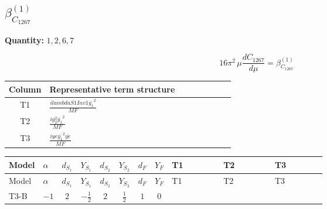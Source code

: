 \documentclass[8pt]{article}
\begin{document}
\begin{landscape}
\section*{$\beta_{C_{1267}}^{(1)}$}
\noindent\textbf{Quantity: }$\mathrm{1,2,6,7}$\par\smallskip
\[16\pi^2\,\mu\frac{d C_{1267}}{d\mu}=\beta_{C_{1267}}^{(1)}\]
\begin{center}
\begin{tabular}{@{}c >{\raggedright\arraybackslash}p{0.82\linewidth}@{}}
\toprule
Column & Representative term structure \\
\midrule
T1 & \(\displaystyle \frac{i lambdaS1Inv1 \overline{y_{1}}^{2}}{MF}\) \\
\midrule
T2 & \(\displaystyle \frac{i g_{2}^{2} \overline{y_{1}}^{2}}{MF}\) \\
\midrule
T3 & \(\displaystyle \frac{i ye \overline{y_{1}}^{2} \overline{ye}}{MF}\) \\
\midrule
\bottomrule
\end{tabular}
\end{center}
\smallskip
\tiny
\begin{longtable}{@{}llcccccc >{\raggedright\arraybackslash}p{0.21\linewidth} >{\raggedright\arraybackslash}p{0.21\linewidth} >{\raggedright\arraybackslash}p{0.21\linewidth}@{}}
\toprule
Model & $\alpha$ & $d_{S_1}$ & $Y_{S_1}$ & $d_{S_2}$ & $Y_{S_2}$ & $d_F$ & $Y_F$ & T1 & T2 & T3 \\
\midrule
\endfirsthead
\toprule
Model & $\alpha$ & $d_{S_1}$ & $Y_{S_1}$ & $d_{S_2}$ & $Y_{S_2}$ & $d_F$ & $Y_F$ & T1 & T2 & T3 \\
\midrule
\endhead
T3-B & $-1$ & $2$ & $-\frac{1}{2}$ & $2$ & $\frac{1}{2}$ & $1$ & $0$ & \scriptsize\adjustbox{max width=\linewidth}{$\begin{gathered} \frac{i lambdaS1Inv1 \overline{y_{1}}^{2}}{4 MF}\end{gathered}$} & \scriptsize\adjustbox{max width=\linewidth}{$\begin{gathered} \frac{3 i g_{2}^{2} \overline{y_{1}}^{2}}{8 MF}\end{gathered}$} & \scriptsize\adjustbox{max width=\linewidth}{$\begin{gathered} - \frac{i ye \overline{y_{1}}^{2} \overline{ye}}{8 MF}\end{gathered}$} \\
\midrule
\bottomrule
\end{longtable}
\clearpage

\end{landscape}
\end{document}

